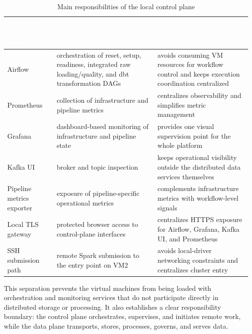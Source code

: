 \begin{table}[!htbp]
    \centering
    \footnotesize
    \renewcommand{\arraystretch}{1.16}
    \begin{tabularx}{\textwidth}{|Y|Y|Y|}
        \hline
        \textcolor{white}{\textbf{Control-plane service}} & \textcolor{white}{\textbf{Operational role}} & \textcolor{white}{\textbf{Reason for local placement}} \\
        \hline
        Airflow & orchestration of reset, setup, readiness, integrated raw loading/quality, and dbt transformation DAGs & avoids consuming VM resources for workflow control and keeps execution coordination centralized \\
        \hline
        Prometheus & collection of infrastructure and pipeline metrics & centralizes observability and simplifies metric management \\
        \hline
        Grafana & dashboard-based monitoring of infrastructure and pipeline state & provides one visual supervision point for the whole platform \\
        \hline
        Kafka UI & broker and topic inspection & keeps operational visibility outside the distributed data services themselves \\
        \hline
        Pipeline metrics exporter & exposure of pipeline-specific operational metrics & complements infrastructure metrics with workflow-level signals \\
        \hline
        Local TLS gateway & protected browser access to control-plane interfaces & centralizes HTTPS exposure for Airflow, Grafana, Kafka UI, and Prometheus \\
        \hline
        SSH submission path & remote Spark submission to the entry point on VM2 & avoids local-driver networking constraints and centralizes cluster entry \\
        \hline
    \end{tabularx}
    \caption{Main responsibilities of the local control plane}
    \label{tab:chapter6-control-plane}
\end{table}

This separation prevents the virtual machines from being loaded with orchestration and monitoring services that do not participate directly in distributed storage or processing. It also establishes a clear responsibility boundary: the control plane orchestrates, supervises, and initiates remote work, while the data plane transports, stores, processes, governs, and serves data.

